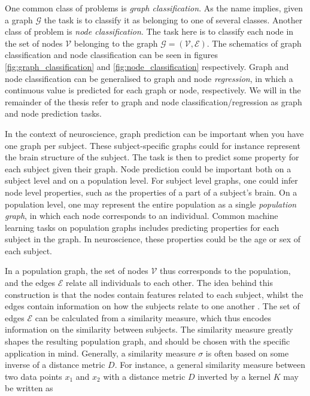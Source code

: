 One common class of problems is \textit{graph classification}. As the name implies, given a graph $\mathcal{G}$ the task is to classify it as belonging to one of several classes. Another class of problem is \textit{node classification}. The task here is to classify each node in the set of nodes $\mathcal{V}$ belonging to the graph $\mathcal{G} = \left(\mathcal{V}, \mathcal{E} \right)$. The schematics of graph classification and node classification can be seen in figures \ref{fig:graph_classification} and \ref{fig:node_classification} respectively. Graph and node classification can be generalised to graph and node \textit{regression}, in which a continuous value is predicted for each graph or node, respectively. We will in the remainder of the thesis refer to graph and node classification/regression as graph and node prediction tasks.

In the context of neuroscience, graph prediction can be important when you have one graph per subject. These subject-specific graphs could for instance represent the brain structure of the subject. The task is then to predict some property for each subject given their graph. Node prediction could be important both on a subject level and on a population level. For subject level graphs, one could infer node level properties, such as the properties of a part of a subject's brain. On a population level, one may represent the entire population as a single \textit{population graph}, in which each node corresponds to an individual. Common machine learning tasks on population graphs includes predicting properties for each subject in the graph. In neuroscience, these properties could be the age or sex of each subject. 

In a population graph, the set of nodes $\mathcal{V}$ thus corresponds to the population, and the edges $\mathcal{E}$ relate all individuals to each other. The idea behind this construction is that the nodes contain features related to each subject, whilst the edges contain information on how the subjects relate to one another \cite{stankeviciute}. The set of edges $\mathcal{E}$ can be calculated from a similarity measure, which thus encodes information on the similarity between subjects. The similarity measure greatly shapes the resulting population graph, and should be chosen with the specific application in mind. Generally, a similarity measure $\sigma$ is often based on some inverse of a distance metric $D$. For instance, a general similarity measure between two data points $x_1$ and $x_2$ with a distance metric $D$ inverted by a kernel $K$ may be written as

